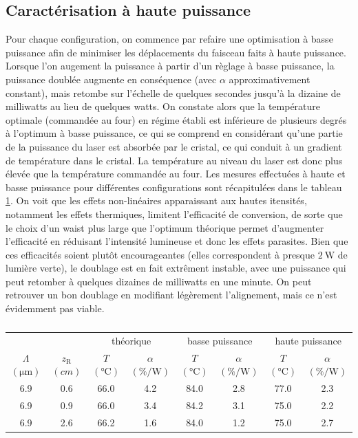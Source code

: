 \documentclass[11pt,a4paper] { article}
\newcommand{\ra}[1]{\renewcommand{\arraystretch}{#1}}
\newcommand{\zr}{z_\mathsc{R}}
\newcommand{\mathsc}[1]{\mathrm{\scriptscriptstyle {#1}}}
\begin{document}
\subsection{Caractérisation à haute puissance}
Pour chaque configuration, on commence par refaire une optimisation à basse puissance afin de minimiser les déplacements du faisceau faits à haute puissance.
Lorsque l'on augement la puissance à partir d'un règlage à basse puissance, la puissance doublée augmente en conséquence (avec $\alpha$ approximativement constant), mais retombe sur l'échelle de quelques secondes jusqu'à la dizaine de milliwatts au lieu de quelques watts. On constate alors que la température optimale (commandée au four) en régime établi est inférieure de plusieurs degrés à l'optimum à basse puissance, ce qui se comprend en considérant qu'une partie de la puissance du laser est absorbée par le cristal, ce qui conduit à un gradient de température dans le cristal. La température au niveau du laser est donc plus élevée que la température commandée au four. Les mesures effectuées à haute et basse puissance pour différentes configurations sont récapitulées dans le tableau \ref{table:mes}. On voit que les effets non-linéaires apparaissant aux hautes itensités, notamment les effets thermiques, limitent l'efficacité de conversion, de sorte que le choix d'un waist plus large que l'optimum théorique permet d'augmenter l'efficacité en réduisant l'intensité lumineuse et donc les effets parasites. Bien que ces efficacités soient plutôt encourageantes (elles correspondent à presque $\SI{2}{\watt}$ de lumière verte), le doublage est en fait extrêment instable, avec une puissance qui peut retomber à quelques dizaines de milliwatts en une minute. On peut retrouver un bon doublage en modifiant légèrement l'alignement, mais ce n'est évidemment pas viable.

\begin{table}[htpb]
\centering
\ra{1.3}
\begin{tabular}{@{}cccccccc@{}} \toprule
 &  & \multicolumn{2}{c}{théorique} & \multicolumn{2}{c}{basse puissance} & \multicolumn{2}{c}{haute puissance} \\ 
 \cmidrule(r){3-4} \cmidrule(lr){5-6} \cmidrule(l){7-8} 
 $\Lambda$ $(\unit{\micro\meter})$ & $\zr$ $(\unit{cm})$ & $T$ $(\unit{\celsius})$ & $\alpha$ $(\unit{\percent\per\watt})$& $T$ $(\unit{\celsius})$ & $\alpha$ $(\unit{\percent\per\watt})$ & $T$ $(\unit{\celsius})$ & $\alpha$ $(\unit{\percent\per\watt})$   \\ \midrule
 6.9       & 0.6  & 66.0  & 4.2      & 84.0 & 2.8      & 77.0 & 2.3      \\
 6.9       & 0.9  & 66.0  & 3.4      & 84.2 & 3.1      & 75.0 & 2.2      \\
 6.9       & 2.6  & 66.2  & 1.6      & 84.0 & 1.2      & 75.0   & 2.7      \\ \bottomrule 
\end{tabular}
\caption{}
\label{table:mes}
\end{table}
\end{document}
